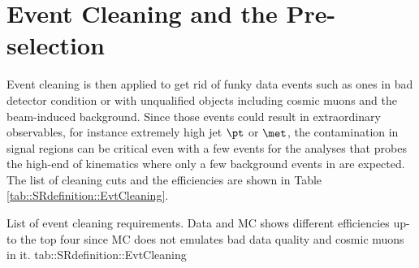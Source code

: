 



\section{Event Cleaning and the Pre-selection} \label{sec::SRdefinition::eventCleaning}
Event cleaning is then applied to get rid of funky data events such as ones in bad detector condition or with unqualified objects including cosmic muons and the beam-induced background. 
Since those events could result in extraordinary observables, for instance extremely high jet $\pt$ or $\met$, 
the contamination in signal regions can be critical even with a few events for the analyses that probes the high-end of kinematics where only a few background events in are expected.
The list of cleaning cuts and the efficiencies are shown in Table \ref{tab::SRdefinition::EvtCleaning}. 

{List of event cleaning requirements. Data and MC shows different efficiencies up-to the top four since MC does not emulates bad data quality and cosmic muons in it.}
{tab::SRdefinition::EvtCleaning}


